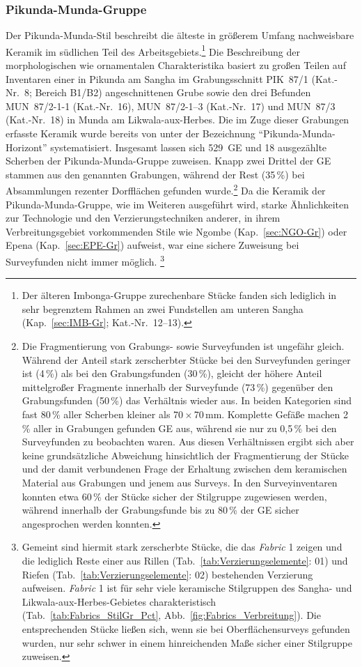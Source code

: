 \subsubsection{Pikunda-Munda-Gruppe}\label{sec:PKM-Gr}

Der Pikunda-Munda-Stil beschreibt die älteste in größerem Umfang nachweisbare Keramik im südlichen Teil des Arbeitsgebiets.\footnote{Der älteren Imbonga-Gruppe zurechenbare Stücke fanden sich lediglich in sehr begrenztem Rahmen an zwei Fundstellen am unteren \mbox{Sangha} (Kap.~\ref{sec:IMB-Gr}; Kat.-Nr.~12--13).} Die Beschreibung der morphologischen wie ornamentalen Charakteristika basiert zu großen Teilen auf Inventaren einer in Pikunda am \mbox{Sangha} im Grabungsschnitt PIK~87/1 (Kat.-Nr.~8; Bereich B1/B2) angeschnittenen Grube sowie den drei Befunden MUN~87/2-1-1 (Kat.-Nr.~16), MUN~87/2-1--3 (Kat.-Nr.~17) und MUN~87/3 (Kat.-Nr.~18) in Munda am Likwala-aux-Herbes. Die im Zuge dieser Grabungen erfasste Keramik wurde bereits von \textcites{Eggert.1992}{Eggert.1993} unter der Bezeichnung \enquote{Pikunda-Munda-Horizont} systematisiert. Insgesamt lassen sich 529~GE und 18 ausgezählte Scherben der Pikunda-Munda-Gruppe zuweisen. Knapp zwei Drittel der GE stammen aus den genannten Grabungen, während der Rest (35\,\%) bei Absammlungen rezenter Dorfflächen gefunden wurde.\footnote{Die Fragmentierung von Grabungs- sowie Surveyfunden ist ungefähr gleich. Während der Anteil stark zerscherbter Stücke bei den Surveyfunden geringer ist (4\,\%) als bei den Grabungsfunden (30\,\%), gleicht der höhere Anteil mittelgroßer Fragmente innerhalb der Surveyfunde (73\,\%) gegenüber den Grabungsfunden (50\,\%) das Verhältnis wieder aus. In beiden Kategorien sind fast 80\,\% aller Scherben kleiner als 70\,$\times$\,70\,mm. Komplette Gefäße machen 2\,\% aller in Grabungen gefunden GE aus, während sie nur zu 0,5\,\% bei den Surveyfunden zu beobachten waren. Aus diesen Verhältnissen ergibt sich aber keine grundsätzliche Abweichung hinsichtlich der Fragmentierung der Stücke und der damit verbundenen Frage der Erhaltung zwischen dem keramischen Material aus Grabungen und jenem aus Surveys. In den Surveyinventaren konnten etwa 60\,\% der Stücke sicher der Stilgruppe zugewiesen werden, während innerhalb der Grabungsfunde bis zu 80\,\% der GE sicher angesprochen werden konnten.} Da die Keramik der Pikunda-Munda-Gruppe, wie im Weiteren ausgeführt wird, starke Ähnlichkeiten zur Technologie und den Verzierungstechniken anderer, in ihrem Verbreitungsgebiet vorkommenden Stile wie Ngombe (Kap.~\ref{sec:NGO-Gr}) oder Epena (Kap.~\ref{sec:EPE-Gr}) aufweist, war eine sichere Zuweisung bei Surveyfunden nicht immer möglich. \footnote{Gemeint sind hiermit stark zerscherbte Stücke, die das \textit{Fabric} 1 zeigen und die lediglich Reste einer aus Rillen (Tab.~\ref{tab:Verzierungselemente}: 01) und Riefen (Tab.~\ref{tab:Verzierungselemente}: 02) bestehenden Verzierung aufweisen. \textit{Fabric} 1 ist für sehr viele keramische Stilgruppen des \mbox{Sangha}- und Likwala-aux-Herbes-Gebietes charakteristisch (Tab.~\ref{tab:Fabrics_StilGr_Pct}, Abb.~\ref{fig:Fabrics_Verbreitung}). Die entsprechenden Stücke ließen sich, wenn sie bei Oberflächensurveys gefunden wurden, nur sehr schwer in einem hinreichenden Maße sicher einer Stilgruppe zuweisen.} 
